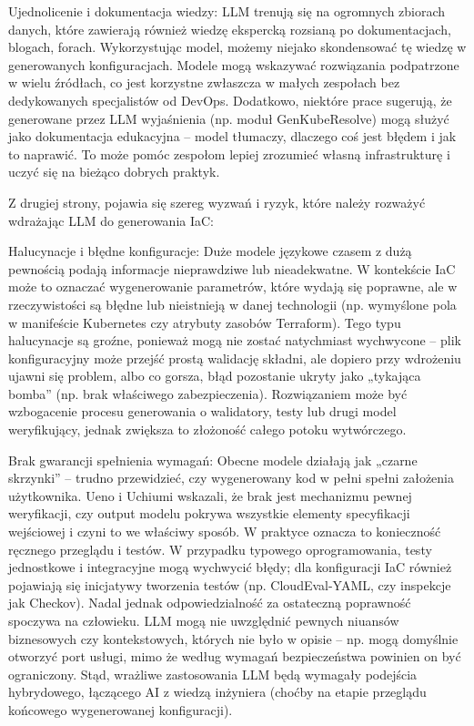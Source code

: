 Ujednolicenie i dokumentacja wiedzy: LLM trenują się na ogromnych zbiorach danych, które zawierają również wiedzę ekspercką rozsianą po dokumentacjach, blogach, forach. Wykorzystując model, możemy niejako skondensować tę wiedzę w generowanych konfiguracjach. Modele mogą wskazywać rozwiązania podpatrzone w wielu źródłach, co jest korzystne zwłaszcza w małych zespołach bez dedykowanych specjalistów od DevOps. Dodatkowo, niektóre prace sugerują, że generowane przez LLM wyjaśnienia (np. moduł GenKubeResolve) mogą służyć jako dokumentacja edukacyjna – model tłumaczy, dlaczego coś jest błędem i jak to naprawić. To może pomóc zespołom lepiej zrozumieć własną infrastrukturę i uczyć się na bieżąco dobrych praktyk.


Z drugiej strony, pojawia się szereg wyzwań i ryzyk, które należy rozważyć wdrażając LLM do generowania IaC:

Halucynacje i błędne konfiguracje: Duże modele językowe czasem z dużą pewnością podają informacje nieprawdziwe lub nieadekwatne. W kontekście IaC może to oznaczać wygenerowanie parametrów, które wydają się poprawne, ale w rzeczywistości są błędne lub nieistnieją w danej technologii (np. wymyślone pola w manifeście Kubernetes czy atrybuty zasobów Terraform). Tego typu halucynacje są groźne, ponieważ mogą nie zostać natychmiast wychwycone – plik konfiguracyjny może przejść prostą walidację składni, ale dopiero przy wdrożeniu ujawni się problem, albo co gorsza, błąd pozostanie ukryty jako „tykająca bomba” (np. brak właściwego zabezpieczenia). Rozwiązaniem może być wzbogacenie procesu generowania o walidatory, testy lub drugi model weryfikujący, jednak zwiększa to złożoność całego potoku wytwórczego.

Brak gwarancji spełnienia wymagań: Obecne modele działają jak „czarne skrzynki” – trudno przewidzieć, czy wygenerowany kod w pełni spełni założenia użytkownika. Ueno i Uchiumi wskazali, że brak jest mechanizmu pewnej weryfikacji, czy output modelu pokrywa wszystkie elementy specyfikacji wejściowej i czyni to we właściwy sposób. W praktyce oznacza to konieczność ręcznego przeglądu i testów. W przypadku typowego oprogramowania, testy jednostkowe i integracyjne mogą wychwycić błędy; dla konfiguracji IaC również pojawiają się inicjatywy tworzenia testów (np. CloudEval-YAML, czy inspekcje jak Checkov). Nadal jednak odpowiedzialność za ostateczną poprawność spoczywa na człowieku. LLM mogą nie uwzględnić pewnych niuansów biznesowych czy kontekstowych, których nie było w opisie – np. mogą domyślnie otworzyć port usługi, mimo że według wymagań bezpieczeństwa powinien on być ograniczony. Stąd, wrażliwe zastosowania LLM będą wymagały podejścia hybrydowego, łączącego AI z wiedzą inżyniera (choćby na etapie przeglądu końcowego wygenerowanej konfiguracji).


